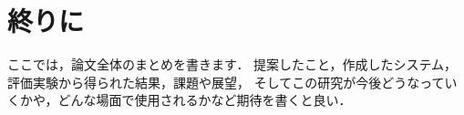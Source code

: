 \chapter{終りに}
\label{chap:conclusion}
ここでは，論文全体のまとめを書きます．
提案したこと，作成したシステム，評価実験から得られた結果，課題や展望，
そしてこの研究が今後どうなっていくかや，どんな場面で使用されるかなど期待を書くと良い．
